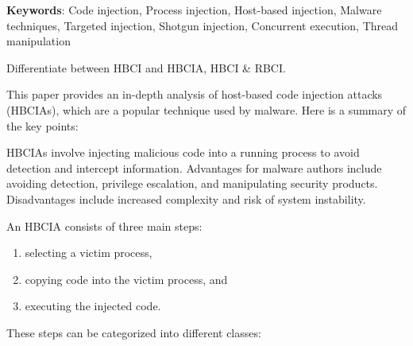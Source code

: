\documentclass{article}
\begin{document}
\textbf{Keywords}: Code injection,  Process injection, Host-based injection, Malware techniques, Targeted injection, Shotgun injection, Concurrent execution, Thread manipulation

Differentiate between HBCI and HBCIA, HBCI \& RBCI.

This paper provides an in-depth analysis of host-based code injection attacks (HBCIAs), which are a popular technique used by malware. Here is a summary of the key points:


HBCIAs involve injecting malicious code into a running process to avoid detection and intercept information. Advantages for malware authors include avoiding detection, privilege escalation, and manipulating security products. Disadvantages include increased complexity and risk of system instability.

An HBCIA consists of three main steps:

\begin{enumerate}
\item selecting a victim process,
\item copying code into the victim process, and
\item executing the injected code.
\end{enumerate}

These steps can be categorized into different classes:
\end{document}
